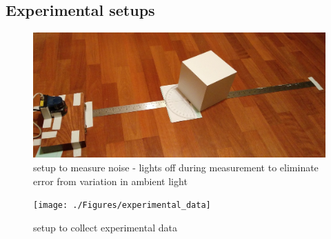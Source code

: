 \begin{appendices}
\chapter{Experimental setups}

\begin{figure}
\centering
 	\includegraphics[width=1\textwidth,trim = 0mm 0mm 0mm 0mm,clip=true]{./Figures/noise_setup}\vspace*{0ex}
  	\caption{setup to measure noise - lights off during measurement to eliminate error from variation in ambient light} \label{fig:noise_setup}
\end{figure}

\begin{figure}
\centering
	 	\texttt{[image: ./Figures/experimental\_data]}\vspace*{0ex}
	  	\caption{setup to collect experimental data} \label{fig:experimental_data}
\end{figure}

\end{appendices}